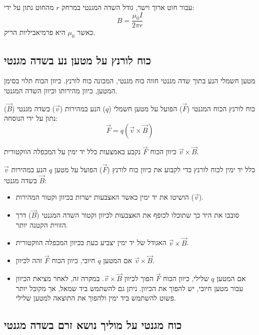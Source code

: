\documentclass[12pt]{article}
\begin{document}
עבור חוט ארוך וישר, גודל השדה המגנטי במרחק \( r \) מהחוט נתון על ידי:
\[ B = \frac{\mu_0 I}{2\pi r} \]
כאשר \( \mu_0 \) היא פרמיאביליות הריק.

\subsection{כוח לורנץ על מטען נע בשדה מגנטי}

מטען חשמלי הנע בתוך שדה מגנטי חווה כוח מגנטי, המכונה כוח לורנץ. כיוון הכוח תלוי בסימן המטען, כיוון מהירותו וכיוון השדה המגנטי.

\begin{definitionBox}{כוח לורנץ}
הכוח המגנטי (\( \vec{F} \)) הפועל על מטען חשמלי (\( q \)) הנע במהירות (\( \vec{v} \)) בשדה מגנטי (\( \vec{B} \)) נתון על ידי הנוסחה:
\[ \vec{F} = q (\vec{v} \times \vec{B}) \]
\end{definitionBox}

כיוון הכוח \( \vec{F} \) נקבע באמצעות כלל יד ימין על המכפלה הווקטורית \( \vec{v} \times \vec{B} \).

\begin{definitionBox}{כלל יד ימין לכוח לורנץ}
כדי לקבוע את כיוון כוח לורנץ (\( \vec{F} \)) הפועל על מטען \( q \) הנע במהירות \( \vec{v} \) בשדה מגנטי \( \vec{B} \):
\begin{itemize}
    \item הושיטו את יד ימין כאשר האצבעות ישרות בכיוון וקטור המהירות (\( \vec{v} \)).
    \item סובבו את היד כך שתוכלו לכופף את האצבעות לכיוון וקטור השדה המגנטי (\( \vec{B} \)) דרך הזווית הקטנה יותר.
    \item האגודל של יד ימין יצביע כעת בכיוון המכפלה הווקטורית \( \vec{v} \times \vec{B} \).
    \item אם המטען \( q \) חיובי, כיוון הכוח \( \vec{F} \) זהה לכיוון \( \vec{v} \times \vec{B} \).
    \item אם המטען \( q \) שלילי, כיוון הכוח \( \vec{F} \) הפוך לכיוון \( \vec{v} \times \vec{B} \). במקרה זה, לאחר מציאת הכיוון עבור מטען חיובי, יש להפוך את הכיוון. ניתן גם להשתמש ביד שמאל, אך מקובל יותר פשוט להשתמש ביד ימין ולהפוך את התוצאה למטען שלילי.
\end{itemize}
\end{definitionBox}

\subsection{כוח מגנטי על מוליך נושא זרם בשדה מגנטי}
\end{document}
